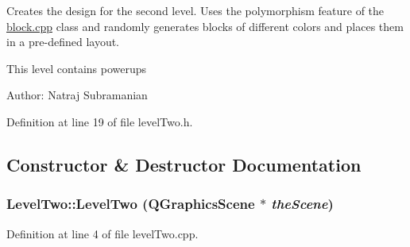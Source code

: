 Creates the design for the second level. Uses the polymorphism feature of the \hyperlink{block_8cpp}{block.cpp} class and randomly generates blocks of different colors and places them in a pre-\/defined layout.

This level contains powerups

Author: Natraj Subramanian 

Definition at line 19 of file levelTwo.h.

\subsection{Constructor \& Destructor Documentation}
\hypertarget{class_level_two_ab23f2b6ad1caa4b7854545e0e3ff9baf}{
\subsubsection[{LevelTwo}]{\setlength{\rightskip}{0pt plus 5cm}LevelTwo::LevelTwo (QGraphicsScene $\ast$ {\em theScene})}}
\label{class_level_two_ab23f2b6ad1caa4b7854545e0e3ff9baf}


Definition at line 4 of file levelTwo.cpp.


